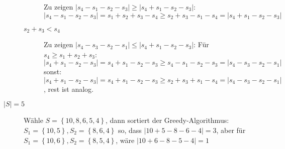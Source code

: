 \documentclass[11pt]{scrartcl}
\begin{document}
\begin{description}
\begin{description}
				Zu zeigen $ \left| s_4 - s_1 - s_2 - s_3 \right| \geq \left| s_4 + s_1 - s_2 - s_3 \right|  $:
				$ \left| s_4 - s_1 - s_2 - s_3 \right| = s_1 + s_2 + s_3 - s_4 \geq  s_2 + s_3 - s_1 - s_4 = \left| s_4 + s_1 - s_2 - s_3 \right|  $ 
			\item[$ s_2 + s_3 < s_4 $]
				Zu zeigen $ \left| s_4 - s_3 - s_2 - s_1 \right| \leq \left| s_4 + s_1 - s_2 - s_3 \right|  $:
				Für $ s_4 \geq s_1 + s_2 + s_3 $:
				$ \left| s_4 + s_1 - s_2 - s_3 \right| = s_4 + s_1 - s_2 - s_3 \geq s_4 - s_1 - s_2 - s_3 = \left| s_4 - s_3 - s_2 - s_1 \right|  $
				sonst:
				$ \left| s_4 + s_1 - s_2 - s_3 \right| = s_4 + s_1 - s_2 - s_3 \geq s_2 + s_3 + s_1 - s_4 = \left| s_4 - s_3 - s_2 - s_1 \right|  $, rest ist analog.
		\end{description}
	\item[$ \left| S \right| = 5 $]
		Wähle $ S = \left\{ 10, 8, 6, 5, 4 \right\}  $, dann sortiert der Greedy-Algorithmus: $ S_1 = \left\{ 10, 5 \right\}, S_2 = \left\{ 8, 6, 4 \right\}   $ so, dass $ \left| 10 + 5 - 8 - 6 - 4 \right| = 3 $, aber für $ S_1 = \left\{ 10, 6 \right\} , S_2 = \left\{ 8, 5, 4 \right\}  $, wäre $ \left| 10 + 6 - 8 - 5 - 4 \right| = 1 $
\end{description}
\end{document}
